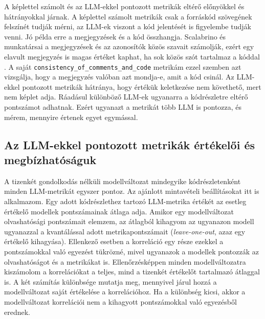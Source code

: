 \documentclass[
]{elteikthesis}[2024/04/26]
\begin{document}
A képlettel számolt és az LLM-ekkel pontozott metrikák eltérő előnyökkel és
hátrányokkal járnak. A képlettel számolt metrikák csak a forráskód szövegének
felszínét tudják mérni, az LLM-ek viszont a kód jelentését is figyelembe tudják %
venni. Jó példa erre a megjegyzések és a kód összhangja. Scalabrino és
munkatársai a megjegyzések és az azonosítók közös szavait számolják, ezért egy
elavult megjegyzés is magas értéket kaphat, ha sok közös szót tartalmaz a kóddal
\cite{scalabrino2018comprehensive}. A saját
\texttt{consistency\_of\_comments\_and\_code} metrikám ezzel szemben azt
vizsgálja, hogy a megjegyzés valóban azt mondja-e, amit a kód csinál. Az
LLM-ekkel pontozott metrikák hátránya, hogy értékük keletkezése nem követhető,
mert nem képlet adja. Ráadásul különböző LLM-ek ugyanarra a kódrészletre eltérő
pontszámot adhatnak. Ezért ugyanazt a metrikát több LLM is pontozza, és mérem,
mennyire értenek egyet egymással.

\subsection{Az LLM-ekkel pontozott metrikák értékelői és megbízhatóságuk}

A tizenkét gondolkodás nélküli modellváltozat mindegyike kódrészletenként minden
LLM-metrikát egyszer pontoz. Az ajánlott mintavételi beállításokat itt is
alkalmazom. Egy adott kódrészlethez tartozó LLM-metrika értékét az esetleg értékelő modellek
pontszámainak átlaga adja. Amikor egy modellváltozat olvashatósági pontszámait
elemzem, az átlagból kihagyom az ugyanazon modell ugyanazzal a kvantálással
adott metrikapontszámait (\textit{leave-one-out}, azaz egy értékelő kihagyása).
Ellenkező esetben a korreláció egy része ezekkel a pontszámokkal való egyezést
tükrözné, mivel ugyanazok a modellek pontozzák az olvashatóságot és a metrikákat
is. Ellenőrzésképpen minden modellváltozatra kiszámolom a korrelációkat a
teljes, mind a tizenkét értékelőt tartalmazó átlaggal is. A két számítás
különbsége mutatja meg, mennyivel járul hozzá a modellváltozat saját értékelése
a korrelációhoz. Ha a különbség kicsi, akkor a modellváltozat korrelációi nem a
kihagyott pontszámokkal való egyezésből erednek.
\end{document}
